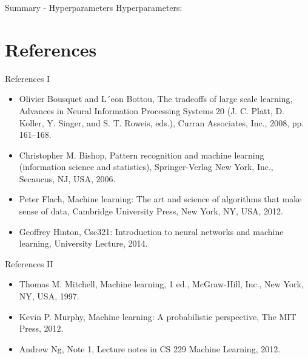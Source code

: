 \documentclass{beamer}
\begin{document}
\begin{frame}{Summary - Hyperparameters}
Hyperparameters:

\end{frame}

\section{References}
\begin{frame}{References I}
\begin{itemize}
\item Olivier Bousquet and L´eon Bottou, The tradeoffs of large scale learning, Advances in Neural Information Processing Systems 20 (J. C. Platt, D. Koller, Y. Singer, and S. T. Roweis, eds.), Curran Associates, Inc., 2008, pp. 161–168.

\item Christopher M. Bishop, Pattern recognition and machine learning (information science and statistics), Springer-Verlag New York, Inc., Secaucus, NJ, USA, 2006.

\item Peter Flach, Machine learning: The art and science of algorithms that make sense of data, Cambridge University Press, New York, NY, USA, 2012.

\item Geoffrey Hinton, Csc321: Introduction to neural networks and
machine learning, University Lecture, 2014.
\end{itemize}
\end{frame}

\begin{frame}{References II}
\begin{itemize}
\item Thomas M. Mitchell, Machine learning, 1 ed., McGraw-Hill, Inc., New York, NY, USA, 1997.

\item Kevin P. Murphy, Machine learning: A probabilistic perspective, The MIT Press, 2012.

\item Andrew Ng, Note 1, Lecture notes in CS 229 Machine Learning, 2012.


\end{itemize}
\end{frame}
\end{document}
